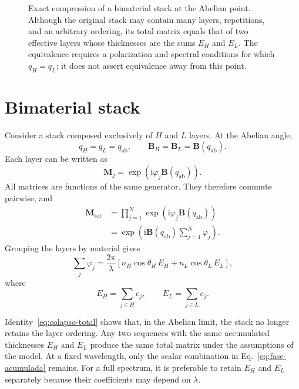 \documentclass[10pt,a4paper]{article}
\newcommand{\ii}{\mathrm{i}}
\newcommand{\M}{\mathbf{M}}
\newcommand{\B}{\mathbf{B}}
\newcommand{\qab}{q_{\mathrm{ab}}}
\begin{document}
\begin{figure}[!t]
\caption{Exact compression of a bimaterial stack at the Abelian point. Although the original stack may contain many layers, repetitions, and an arbitrary ordering, its total matrix equals that of two effective layers whose thicknesses are the sums $E_H$ and $E_L$. The equivalence requires a polarization and spectral conditions for which $q_H=q_L$; it does not assert equivalence away from this point.}
\label{fig:compactacion-abeliana}
\end{figure}

\section{Bimaterial stack}

Consider a stack composed exclusively of $H$ and $L$ layers. At the Abelian angle,
\begin{equation}
q_H=q_L=\qab,
\qquad
\B_H=\B_L=\B(\qab).
\end{equation}
Each layer can be written as
\begin{equation}
\M_j=\exp\!\left(\ii\varphi_j\B(\qab)\right).
\end{equation}
All matrices are functions of the same generator. They therefore commute pairwise, and
\begin{align}
\M_{\mathrm{tot}}
&=\prod_{j=1}^{N}\exp\!\left(\ii\varphi_j\B(\qab)\right)\\
&=\exp\!\left(\ii\B(\qab)\sum_{j=1}^{N}\varphi_j\right).
\label{eq:colapso-total}
\end{align}
Grouping the layers by material gives
\begin{equation}
\sum_j\varphi_j
=\frac{2\pi}{\lambda}\left[
n_H\cos\theta_H\,E_H+n_L\cos\theta_L\,E_L
\right],
\label{eq:fase-acumulada}
\end{equation}
where
\begin{equation}
E_H=\sum_{j\in H}e_j,
\qquad
E_L=\sum_{j\in L}e_j.
\end{equation}

\begin{resultbox}
Identity~\eqref{eq:colapso-total} shows that, in the Abelian limit, the stack no longer retains the layer ordering. Any two sequences with the same accumulated thicknesses $E_H$ and $E_L$ produce the same total matrix under the assumptions of the model. At a fixed wavelength, only the scalar combination in Eq.~\eqref{eq:fase-acumulada} remains. For a full spectrum, it is preferable to retain $E_H$ and $E_L$ separately because their coefficients may depend on $\lambda$.
\end{resultbox}
\end{document}
